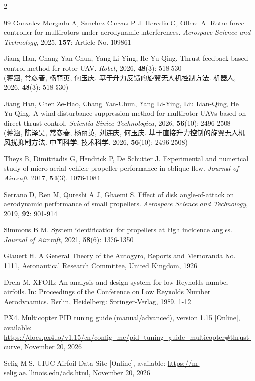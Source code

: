 \documentclass{aas}
\begin{document}
\begin{multicols}{2}
\begin{thebibliography}{99}
 Gonzalez-Morgado A, Sanchez-Cuevas P J, Heredia G, Ollero A. Rotor-force controller for multirotors under aerodynamic interferences. \textit{Aerospace Science and Technology}, 2025, \textbf{157}: Article No. 109861

 Jiang Han, Chang Yan-Chun, Yang Li-Ying, He Yu-Qing. Thrust feedback-based control method for rotor UAV. \textit{Robot}, 2026, \textbf{48}(3): 518-530\\
(蒋涵, 常彦春, 杨丽英, 何玉庆. 基于升力反馈的旋翼无人机控制方法. 机器人, 2026, \textbf{48}(3): 518-530)

 Jiang Han, Chen Ze-Hao, Chang Yan-Chun, Yang Li-Ying, Liu Lian-Qing, He Yu-Qing. A wind disturbance suppression method for multirotor UAVs based on direct thrust control. \textit{Scientia Sinica Technologica}, 2026, \textbf{56}(10): 2496-2508\\
(蒋涵, 陈泽昊, 常彦春, 杨丽英, 刘连庆, 何玉庆. 基于直接升力控制的旋翼无人机风扰抑制方法. 中国科学: 技术科学, 2026, \textbf{56}(10): 2496-2508)

 Theys B, Dimitriadis G, Hendrick P, De Schutter J. Experimental and numerical study of micro-aerial-vehicle propeller performance in oblique flow. \textit{Journal of Aircraft}, 2017, \textbf{54}(3): 1076-1084

 Serrano D, Ren M, Qureshi A J, Ghaemi S. Effect of disk angle-of-attack on aerodynamic performance of small propellers. \textit{Aerospace Science and Technology}, 2019, \textbf{92}: 901-914

 Simmons B M. System identification for propellers at high incidence angles. \textit{Journal of Aircraft}, 2021, \textbf{58}(6): 1336-1350

 Glauert H. \href{https://reports.aerade.cranfield.ac.uk/handle/1826.2/1434}{A General Theory of the Autogyro}, Reports and Memoranda No. 1111, Aeronautical Research Committee, United Kingdom, 1926.

 Drela M. XFOIL: An analysis and design system for low Reynolds number airfoils. In: Proceedings of the Conference on Low Reynolds Number Aerodynamics. Berlin, Heidelberg: Springer-Verlag, 1989. 1-12

 PX4. Multicopter PID tuning guide (manual/advanced), version 1.15 [Online], available: \url{https://docs.px4.io/v1.15/en/config_mc/pid_tuning_guide_multicopter#thrust-curve}, November 20, 2026

 Selig M S. UIUC Airfoil Data Site [Online], available: \url{https://m-selig.ae.illinois.edu/ads.html}, November 20, 2026


\end{thebibliography}
\end{multicols}
\end{document}
